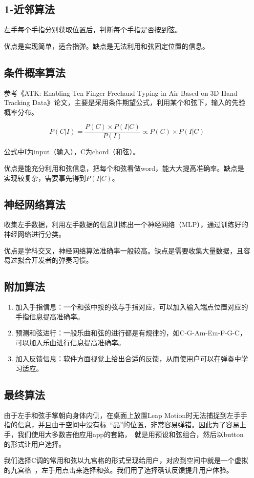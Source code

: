         \subsection{1-近邻算法}

        左手每个手指分别获取位置后，判断每个手指是否按到弦。

        优点是实现简单，适合指弹。缺点是无法利用和弦固定位置的信息。

        \subsection{条件概率算法}

        参考《ATK: Enabling Ten-Finger Freehand Typing in Air Based on 3D Hand Tracking Data》论文，主要是采用条件期望公式，利用某个和弦下，输入的先验概率分布。

        $$P(C|I)=\frac{P(C) \times P(I|C)}{P(I)}\propto P(C)\times P(I|C)$$

        公式中I为input（输入），C为chord（和弦）。

        优点是能充分利用和弦信息，把每个和弦看做word，能大大提高准确率。缺点是实现较复杂，需要事先得到$P(I|C)$。

        \subsection{神经网络算法}

        收集左手数据，利用左手数据的信息训练出一个神经网络（MLP），通过训练好的神经网络进行分类。

        优点是学科交叉，神经网络算法准确率一般较高。缺点是需要收集大量数据，且容易过拟合开发者的弹奏习惯。

        \subsection{附加算法}

        \begin{enumerate}
            \item{加入手指信息}：一个和弦中按的弦与手指对应，可以加入输入端点位置对应的手指信息提高准确率。
            \item{预测和弦进行}：一般乐曲和弦的进行都是有规律的，如C-G-Am-Em-F-G-C，可以加入乐曲进行信息提高准确率。
            \item{加入反馈信息}：软件方面视觉上给出合适的反馈，从而使用户可以在弹奏中学习适应。
        \end{enumerate}

        \subsection{最终算法}

        由于左手和弦手掌朝向身体内侧，在桌面上放置Leap Motion时无法捕捉到左手手指的信息，并且由于空间中没有标\
        “品”的位置，非常容易弹错。因此为了容易上手，我们使用大多数吉他应用app的套路，\
        就是用预设和弦组合，然后以button的形式让用户选择。

        我们选择C调的常用和弦以九宫格的形式呈现给用户，对应到空间中就是一个虚拟的九宫格\
        ，左手用点击来选择和弦。我们用了选择确认反馈提升用户体验。
